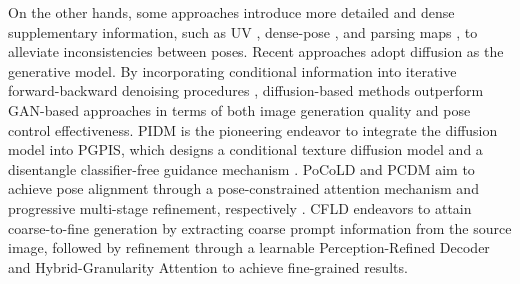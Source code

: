 On the other hands, some approaches introduce more detailed and dense supplementary information, such as UV \cite{sarkar2021style}, dense-pose \cite{han2023controllable}, and parsing maps \cite{men2020controllable,zhang2021pise,zhou2022cross,lv2021learning}, to alleviate inconsistencies between poses. 
Recent approaches adopt diffusion as the generative model\cite{bhunia2023person,shen2024advancing,lu2024coarse,han2023controllable}. 
%
By incorporating conditional information into iterative forward-backward denoising procedures \cite{ho2020denoising}, diffusion-based methods outperform GAN-based approaches in terms of both image generation quality and pose control effectiveness.
PIDM is the pioneering endeavor to integrate the diffusion model into PGPIS, which designs a conditional texture diffusion model and a disentangle classifier-free guidance mechanism \cite{ho2022classifier}. 
PoCoLD and PCDM aim to achieve pose alignment through a pose-constrained attention mechanism and progressive multi-stage refinement, respectively \cite{han2023controllable,shen2024advancing}.
CFLD \cite{lu2024coarse} endeavors to attain coarse-to-fine generation by extracting coarse prompt information from the source image, followed by refinement through a learnable Perception-Refined Decoder and Hybrid-Granularity Attention to achieve fine-grained results. 
%

